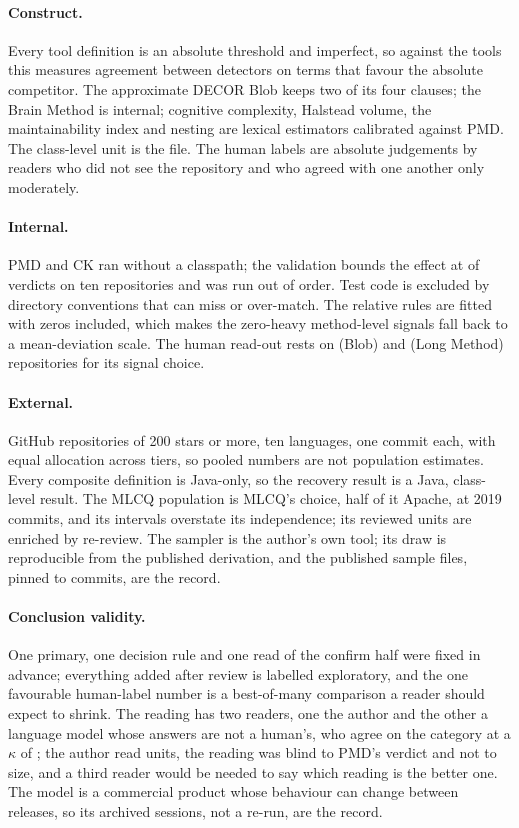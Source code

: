 \documentclass[11pt,a4paper]{article}
\begin{document}
\paragraph{Construct.} Every tool definition is an absolute threshold and
imperfect, so against the tools this measures agreement between detectors on
terms that favour the absolute competitor. The approximate DECOR Blob keeps
two of its four clauses; the Brain Method is internal; cognitive complexity,
Halstead volume, the maintainability index and nesting are lexical estimators
calibrated against PMD. The class-level unit is the file. The human labels are
absolute judgements by readers who did not see the repository and who agreed
with one another only moderately.

\paragraph{Internal.} PMD and CK ran without a classpath; the validation
bounds the effect at \cpRate{} of verdicts on ten repositories and was run out
of order. Test code is excluded by directory conventions that can miss or
over-match. The relative rules are fitted with zeros included, which makes the
zero-heavy method-level signals fall back to a mean-deviation scale. The human
read-out rests on \humBlobAllMinPosEx{} (Blob) and \humLongMethodAllMinPosEx{}
(Long Method) repositories for its signal choice.

\paragraph{External.} GitHub repositories of 200 stars or more, ten languages,
one commit each, with equal allocation across tiers, so pooled numbers are not
population estimates. Every composite definition is Java-only, so the recovery
result is a Java, class-level result. The MLCQ population is MLCQ's choice,
half of it Apache, at 2019 commits, and its intervals overstate its
independence; its reviewed units are enriched by re-review. The sampler is the
author's own tool; its draw is reproducible from the published derivation, and
the published sample files, pinned to commits, are the record.

\paragraph{Conclusion validity.} One primary, one decision rule and one read
of the confirm half were fixed in advance; everything added after review is
labelled exploratory, and the one favourable human-label number is a
best-of-many comparison a reader should expect to shrink. The reading has two
readers, one the author and the other a language model whose answers are not
a human's, who agree on the category at a $\kappa$ of \fpKappaAuthorModel{};
the author read \fpKappaAuthorModelN{} units, the reading was blind to PMD's
verdict and not to size, and a third reader would be needed to say which
reading is the better one. The model is a commercial product whose behaviour
can change between releases, so its archived sessions, not a re-run, are the
record.
\end{document}
